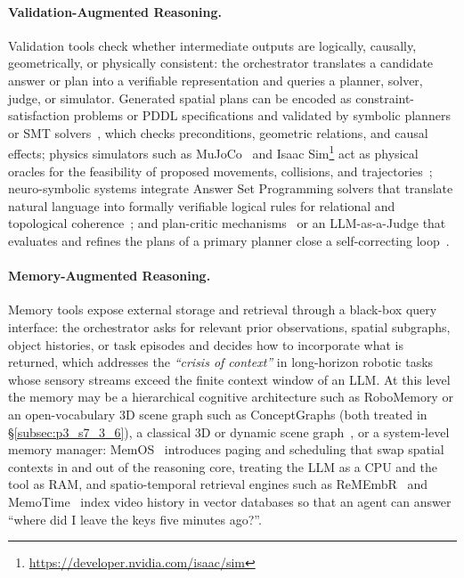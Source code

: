 \paragraph{Validation-Augmented Reasoning.}
Validation tools check whether intermediate outputs are logically, causally, geometrically, or physically consistent: the orchestrator translates a candidate answer or plan into a verifiable representation and queries a planner, solver, judge, or simulator.
Generated spatial plans can be encoded as constraint-satisfaction problems or PDDL specifications and validated by symbolic planners or SMT solvers~\cite{liu2023llmp,hao2023reasoning,yang2023coupling}, which checks preconditions, geometric relations, and causal effects;
physics simulators such as MuJoCo~\cite{todorov2012mujoco} and Isaac Sim\footnote{\url{https://developer.nvidia.com/isaac/sim}} act as physical oracles for the feasibility of proposed movements, collisions, and trajectories~\cite{liu2022mindseye,huang2023voxposer,chen2024spatialvlm};
neuro-symbolic systems integrate Answer Set Programming solvers that translate natural language into formally verifiable logical rules for relational and topological coherence~\cite{yang2020neurasp,premsri2024neurosymbolic};
and plan-critic mechanisms~\cite{lei2025stma,wang2025multiagent} or an LLM-as-a-Judge that evaluates and refines the plans of a primary planner close a self-correcting loop~\cite{hariharan2025plan}.


\paragraph{Memory-Augmented Reasoning.}
Memory tools expose external storage and retrieval through a black-box query interface: the orchestrator asks for relevant prior observations, spatial subgraphs, object histories, or task episodes and decides how to incorporate what is returned, which addresses the \textit{``crisis of context''} in long-horizon robotic tasks whose sensory streams exceed the finite context window of an LLM.
At this level the memory may be a hierarchical cognitive architecture such as RoboMemory or an open-vocabulary 3D scene graph such as ConceptGraphs (both treated in §\ref{subsec:p3_s7_3_6}), a classical 3D or dynamic scene graph~\cite{armeni20193dsg,rosinol20203ddsg}, or a system-level memory manager: MemOS~\cite{li2025memos} introduces paging and scheduling that swap spatial contexts in and out of the reasoning core, treating the LLM as a CPU and the tool as RAM, and spatio-temporal retrieval engines such as ReMEmbR~\cite{anwar2025remembr} and MemoTime~\cite{tan2025memotime} index video history in vector databases so that an agent can answer ``where did I leave the keys five minutes ago?''.

